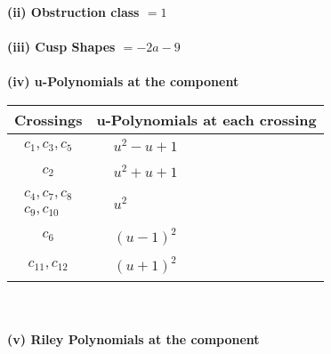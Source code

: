 \documentclass[1p]{elsarticle_modified}
\theoremstyle{definition}
\begin{document}
\flushleft \textbf{(ii) Obstruction class $= 1$}\\~\\
\flushleft \textbf{(iii) Cusp Shapes $= -2 a-9$}\\~\\
\newpage\renewcommand{\arraystretch}{1}
\flushleft \textbf{(iv) u-Polynomials at the component}\newline \\
\begin{tabular}{m{50pt}|m{274pt}}
Crossings & \hspace{64pt}u-Polynomials at each crossing \\
\hline $$\begin{aligned}c_{1},c_{3},c_{5}\end{aligned}$$&$\begin{aligned}
&u^2- u+1
\end{aligned}$\\
\hline $$\begin{aligned}c_{2}\end{aligned}$$&$\begin{aligned}
&u^2+u+1
\end{aligned}$\\
\hline $$\begin{aligned}c_{4},c_{7},c_{8}\\c_{9},c_{10}\end{aligned}$$&$\begin{aligned}
&u^2
\end{aligned}$\\
\hline $$\begin{aligned}c_{6}\end{aligned}$$&$\begin{aligned}
&(u-1)^2
\end{aligned}$\\
\hline $$\begin{aligned}c_{11},c_{12}\end{aligned}$$&$\begin{aligned}
&(u+1)^2
\end{aligned}$\\
\hline
\end{tabular}\\~\\
\newpage\renewcommand{\arraystretch}{1}
\flushleft \textbf{(v) Riley Polynomials at the component}\newline \\
\end{document}
